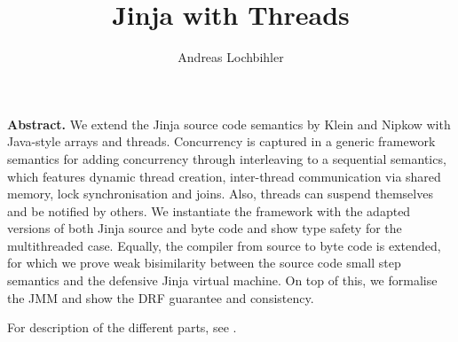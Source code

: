 \documentclass[11pt,a4paper]{book}
\begin{document}
\title{Jinja with Threads}
\author{Andreas Lochbihler}
\maketitle

\begin{trivlist}
\item \textbf{Abstract.}
  We extend the Jinja source code semantics by Klein and Nipkow with Java-style arrays and threads.
  Concurrency is captured in a generic framework semantics for adding concurrency through interleaving to a sequential semantics, which features dynamic thread creation, inter-thread communication via shared memory, lock synchronisation and joins. Also, threads can suspend themselves and be notified by others.
  We instantiate the framework with the adapted versions of both Jinja source and byte code and show type safety for the multithreaded case. 
  Equally, the compiler from source to byte code is extended, for which we prove weak bisimilarity between the source code small step semantics and the defensive Jinja virtual machine.
  On top of this, we formalise the JMM and show the DRF guarantee and consistency.

  For description of the different parts, see \cite{Lochbihler2008FOOL,Lochbihler2010ESOP,LochbihlerBulwahn2011ITP,Lochbihler2012ESOP}.
\end{trivlist}

\tableofcontents




\clearpage





\end{document}
